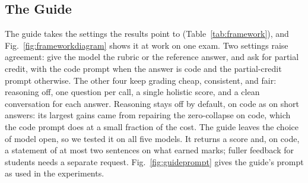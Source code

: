 \subsection{The Guide}
\label{sec:guide}


The guide takes the settings the results point to (Table~\ref{tab:framework}), and
Fig.~\ref{fig:frameworkdiagram} shows it at work on one exam. Two settings raise agreement: give the model the
rubric or the reference answer, and ask for partial credit, with the code prompt when the answer is code and the
partial-credit prompt otherwise. The other four keep grading cheap, consistent, and fair: reasoning off, one
question per call, a single holistic score, and a clean conversation for each answer. Reasoning stays
off by default, on code as on short answers: its largest gains came from repairing the zero-collapse on code, which the code prompt does at
a small fraction of the cost. The guide leaves the choice of model open, so we tested it on all five models. It
returns a score and, on code, a statement of at most two sentences on what earned marks; fuller feedback for
students needs a separate request. Fig.~\ref{fig:guideprompt} gives the guide's prompt as used in the
experiments.




